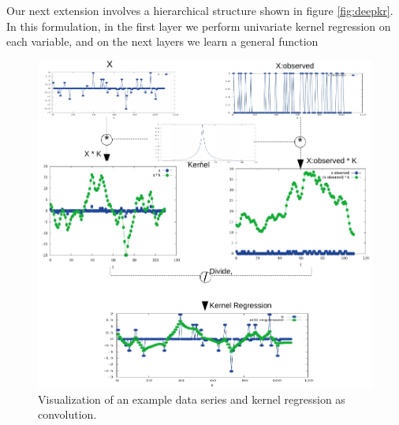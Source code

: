 \documentclass{article} %
\begin{document}
Our next extension involves a hierarchical structure shown in figure \ref{fig:deepkr}. In this formulation, in the first layer we perform univariate kernel regression on each variable, and on the next layers we learn a general function 




\begin{figure}[h]
\begin{center}
\includegraphics[width=\textwidth]{img/formulation-crop.pdf}
\end{center}
\caption{Visualization of an example data series and kernel regression as convolution.}\label{fig:formulation}
\end{figure}
\end{document}
